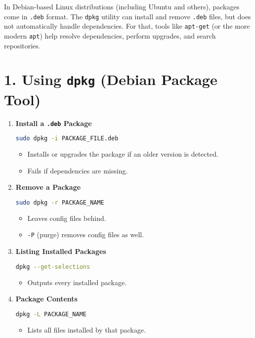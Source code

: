 \documentclass[a4paper]{report}
\begin{document}
In Debian-based Linux distributions (including Ubuntu and others), packages come in \texttt{.deb} format. The \texttt{dpkg} utility can install and remove \texttt{.deb} files, but does not automatically handle dependencies. For that, tools like \texttt{apt-get} (or the more modern \texttt{apt}) help resolve dependencies, perform upgrades, and search repositories.

\section*{1. Using \texttt{dpkg} (Debian Package Tool)}

\begin{enumerate}
    \item \textbf{Install a \texttt{.deb} Package}
    \begin{lstlisting}[language=bash]
sudo dpkg -i PACKAGE_FILE.deb
    \end{lstlisting}
    \begin{itemize}
        \item Installs or upgrades the package if an older version is detected.
        \item Fails if dependencies are missing.
    \end{itemize}

    \item \textbf{Remove a Package}
    \begin{lstlisting}[language=bash]
sudo dpkg -r PACKAGE_NAME
    \end{lstlisting}
    \begin{itemize}
        \item Leaves config files behind.
        \item \texttt{-P} (purge) removes config files as well.
    \end{itemize}

    \item \textbf{Listing Installed Packages}
    \begin{lstlisting}[language=bash]
dpkg --get-selections
    \end{lstlisting}
    \begin{itemize}
        \item Outputs every installed package.
    \end{itemize}

    \item \textbf{Package Contents}
    \begin{lstlisting}[language=bash]
dpkg -L PACKAGE_NAME
    \end{lstlisting}
    \begin{itemize}
        \item Lists all files installed by that package.
    \end{itemize}


\end{enumerate}
\end{document}
